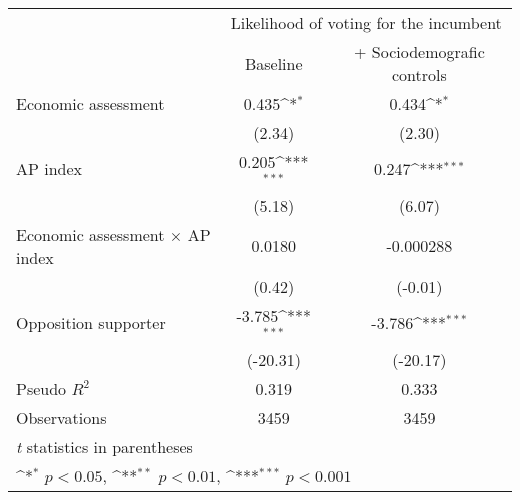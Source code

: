 {
\def\sym#1{\ifmmode^{#1}\else\(^{#1}\)\fi}
\begin{tabular}{l*{2}{c}}
\toprule
                &\multicolumn{2}{c}{Likelihood of voting for the incumbent}\\\cmidrule(lr){2-3}
                & Baseline         &+ Sociodemografic controls         \\
\midrule
Economic assessment&    0.435\sym{*}  &    0.434\sym{*}  \\
                &   (2.34)         &   (2.30)         \\
AP index        &    0.205\sym{***}&    0.247\sym{***}\\
                &   (5.18)         &   (6.07)         \\
Economic assessment $\times$ AP index&   0.0180         &-0.000288         \\
                &   (0.42)         &  (-0.01)         \\
Opposition supporter&   -3.785\sym{***}&   -3.786\sym{***}\\
                & (-20.31)         & (-20.17)         \\
\midrule
Pseudo \(R^{2}\)&    0.319         &    0.333         \\
Observations    &     3459         &     3459         \\
\bottomrule
\multicolumn{3}{l}{\footnotesize \textit{t} statistics in parentheses}\\
\multicolumn{3}{l}{\footnotesize \sym{*} \(p<0.05\), \sym{**} \(p<0.01\), \sym{***} \(p<0.001\)}\\
\end{tabular}
}
